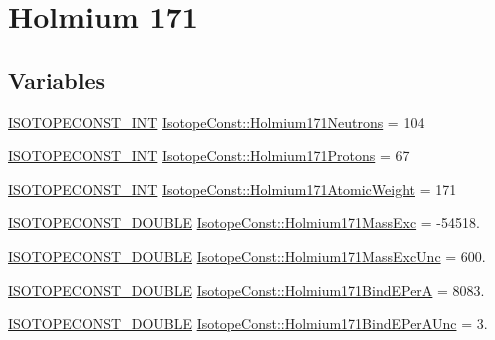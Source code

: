 \hypertarget{group___isotope_const-_holmium-_ho171}{}\section{Holmium 171}
\label{group___isotope_const-_holmium-_ho171}
\subsection*{Variables}
\begin{DoxyCompactItemize}
\item 
\mbox{\hyperlink{group___isotope_const-_macros_ga5f18360b3e99483a35c32d789e62621c}{I\+S\+O\+T\+O\+P\+E\+C\+O\+N\+S\+T\+\_\+\+I\+NT}} \mbox{\hyperlink{group___isotope_const-_holmium-_ho171_ga53d8c027419c8754c54539c4ff2e0886}{Isotope\+Const\+::\+Holmium171\+Neutrons}} = 104
\item 
\mbox{\hyperlink{group___isotope_const-_macros_ga5f18360b3e99483a35c32d789e62621c}{I\+S\+O\+T\+O\+P\+E\+C\+O\+N\+S\+T\+\_\+\+I\+NT}} \mbox{\hyperlink{group___isotope_const-_holmium-_ho171_ga7400565726ec8bcfe68e3e3a3521666c}{Isotope\+Const\+::\+Holmium171\+Protons}} = 67
\item 
\mbox{\hyperlink{group___isotope_const-_macros_ga5f18360b3e99483a35c32d789e62621c}{I\+S\+O\+T\+O\+P\+E\+C\+O\+N\+S\+T\+\_\+\+I\+NT}} \mbox{\hyperlink{group___isotope_const-_holmium-_ho171_gaf748a8f07a3e50aa8429fd11efa5b7d7}{Isotope\+Const\+::\+Holmium171\+Atomic\+Weight}} = 171
\item 
\mbox{\hyperlink{group___isotope_const-_macros_ga8f45a7272ce02c0b4c65c44636ed719a}{I\+S\+O\+T\+O\+P\+E\+C\+O\+N\+S\+T\+\_\+\+D\+O\+U\+B\+LE}} \mbox{\hyperlink{group___isotope_const-_holmium-_ho171_ga917502926219c401dc2091b7a2cb155c}{Isotope\+Const\+::\+Holmium171\+Mass\+Exc}} = -\/54518.
\item 
\mbox{\hyperlink{group___isotope_const-_macros_ga8f45a7272ce02c0b4c65c44636ed719a}{I\+S\+O\+T\+O\+P\+E\+C\+O\+N\+S\+T\+\_\+\+D\+O\+U\+B\+LE}} \mbox{\hyperlink{group___isotope_const-_holmium-_ho171_gaaa86c2834afcf39595a50225ae06c34e}{Isotope\+Const\+::\+Holmium171\+Mass\+Exc\+Unc}} = 600.
\item 
\mbox{\hyperlink{group___isotope_const-_macros_ga8f45a7272ce02c0b4c65c44636ed719a}{I\+S\+O\+T\+O\+P\+E\+C\+O\+N\+S\+T\+\_\+\+D\+O\+U\+B\+LE}} \mbox{\hyperlink{group___isotope_const-_holmium-_ho171_gafcc25831e7e231dffed040611ecafea4}{Isotope\+Const\+::\+Holmium171\+Bind\+E\+PerA}} = 8083.
\item 
\mbox{\hyperlink{group___isotope_const-_macros_ga8f45a7272ce02c0b4c65c44636ed719a}{I\+S\+O\+T\+O\+P\+E\+C\+O\+N\+S\+T\+\_\+\+D\+O\+U\+B\+LE}} \mbox{\hyperlink{group___isotope_const-_holmium-_ho171_ga8b6e8580617e870d7d683e432f0e71c9}{Isotope\+Const\+::\+Holmium171\+Bind\+E\+Per\+A\+Unc}} = 3.

\end{DoxyCompactItemize}
